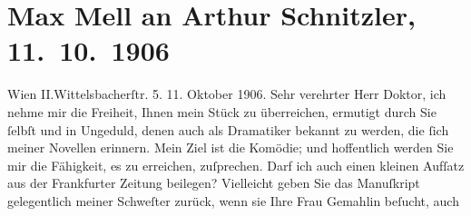 

         
         \newcommand{\erwaehntePersonen}{Personen: Josef Kainz, Maria Mell, Olga Schnitzler}
         \newcommand{\erwaehnteInstitutionen}{Institutionen: Frankfurter Zeitung}
         \newcommand{\erwaehnteOrte}{Orte: Berlin, II., Leopoldstadt, Wien, Wittelsbachstraße}
         \newcommand{\erwaehnteWerke}{Werke: Die Komödianten, Über die Briefe Beethovens}
               \section[Max Mell an Arthur Schnitzler, 11. 10. 1906]{ Max Mell an Arthur Schnitzler, 11. 10. 1906}\nopagebreak{}\rehead{ }\begin{ledgroupsized}[t]{13cm}\normalsize\beginnumbering \toendnotes[C]{\smallbreak\pagebreak[2]} 
\toendnotes[C]{\smallbreak}\pstart
           \noindent{}\raggedleft{}{\pb}Wien II.Wittelsbacherſtr. 5.\pend
           \pstart
           \raggedleft{}11. Oktober 1906.\pend
           \pstart{}Sehr verehrter Herr Doktor,\pend\pstart
           ich nehme mir die Freiheit, Ihnen mein Stück zu überreichen, ermutigt durch Sie ſelbſt und in Ungeduld, denen
                    auch als Dramatiker bekannt zu werden, die ſich meiner Novellen erinnern. Mein
                    Ziel ist die Komödie; und hoffentlich werden Sie mir die Fähigkeit, es zu
                    erreichen, zuſprechen.\pend
           \pstart
           Darf ich auch einen kleinen Aufſatz
                    aus der Frankfurter Zeitung beilegen?\pend
           \pstart
           Vielleicht geben Sie das Manuſkript gelegentlich meiner Schweſter zurück, wenn sie Ihre Frau Gemahlin beſucht, auch

\end{ledgroupsized}
